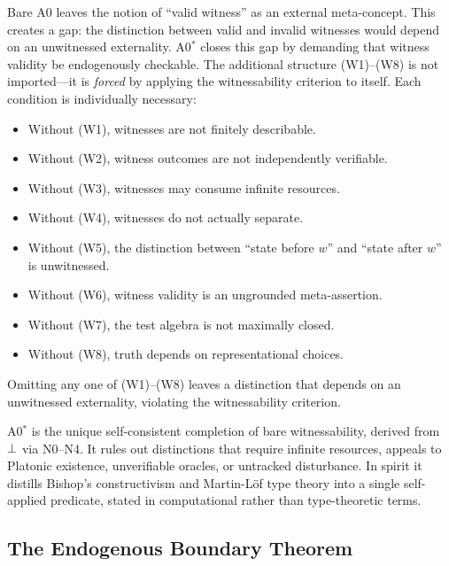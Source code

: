 \begin{remark}
\label{rem:why-a0star}
Bare A0 leaves the notion of ``valid witness'' as an external
meta-concept.  This creates a gap: the distinction between valid and
invalid witnesses would depend on an unwitnessed externality.  A0$^*$
closes this gap by demanding that witness validity be endogenously
checkable.  The additional structure (W1)--(W8) is not imported---it is
\emph{forced} by applying the witnessability criterion to itself.  Each
condition is individually necessary:
\begin{itemize}[nosep]
  \item Without (W1), witnesses are not finitely describable.
  \item Without (W2), witness outcomes are not independently verifiable.
  \item Without (W3), witnesses may consume infinite resources.
  \item Without (W4), witnesses do not actually separate.
  \item Without (W5), the distinction between ``state before $w$'' and
        ``state after $w$'' is unwitnessed.
  \item Without (W6), witness validity is an ungrounded meta-assertion.
  \item Without (W7), the test algebra is not maximally closed.
  \item Without (W8), truth depends on representational choices.
\end{itemize}
Omitting any one of (W1)--(W8) leaves a distinction that depends on an
unwitnessed externality, violating the witnessability criterion.
\end{remark}

A0$^*$ is the unique self-consistent completion of bare
witnessability, derived from $\bot$ via N0--N4.  It rules out distinctions that require infinite resources,
appeals to Platonic existence, unverifiable oracles, or untracked
disturbance.  In spirit it distills Bishop's constructivism
\citep{bishop1967} and Martin-L\"{o}f type theory \citep{martinlof1984}
into a single self-applied predicate, stated in computational rather than
type-theoretic terms.

\subsection{The Endogenous Boundary Theorem}
\label{sec:axioms:boundary}

